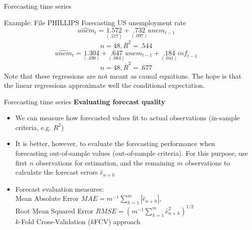 \documentclass{beamer}
\begin{document}

\begin{frame}{Forecasting time series}
\begin{block}{Example: File PHILLIPS}
Forecasting US unemployment rate
$$\widehat{\textit{unem}}_t = \underset{(.577)}{1.572} 
   + \underset{(.097)}{.732}\textit{unem}_{ t-1}$$
$$ n= 48, \overline{R}^2=.544$$
$$ \widehat{\textit{unem}}_t = \underset{(.490)}{1.304} + \underset{(.084)}{.647}\textit{unem}_{t-1}+\underset{(.041)}{.184} \textit{inf}_{t-1}$$
$$n=48,  \overline{R}^2=.677$$
Note that these regressions are not meant as causal equations. The hope is that the linear regressions approximate well the conditional expectation. 
\end{block}
\end{frame}


\begin{frame}{Forecasting time series}
\textbf{Evaluating forecast quality}
\begin{itemize}
\item We can measure how forecasted values fit to actual observations (in-sample criteria, e.g. $R^2$)
\vspace{0.2cm}
\item It is better, however, to evaluate the forecasting performance when forecasting out-of-sample values (out-of-sample criteria). For this purpose, use first $n$ observations for estimation, and the  remaining $m$ observations to calculate the forecast errors $\hat{e}_{n+h}$
\vspace{0.2cm}
\item Forecast evaluation measures: \\
\vspace{0.2cm}
Mean Absolute Error $\textit{MAE} = m^{-1}\sum_{h=1}^{m}|\hat{e}_{n+h}|$, \\
\vspace{0.2cm}
Root Mean Squared Error $\textit{RMSE} = (m^{-1}\sum_{h=1}^{m}\hat{e}_{n+h}^2)^{1/2}$\\
\vspace{0.2 cm}
$k$-Fold Cross-Validation ($k$FCV) approach
\end{itemize}

\end{frame}


\end{document}
